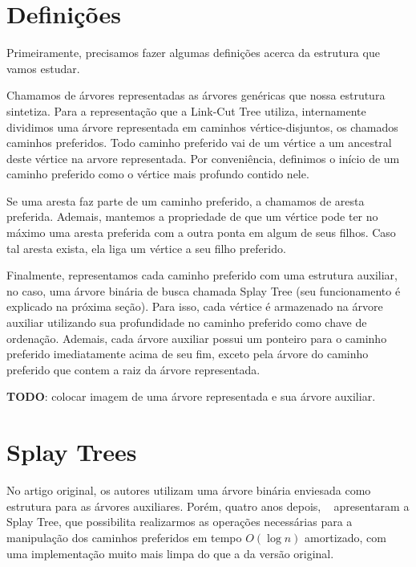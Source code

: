 \section{Definições}
\label{sec:lct-definicoes}

Primeiramente, precisamos fazer algumas definições acerca da estrutura que vamos estudar.

Chamamos de árvores representadas as árvores genéricas que nossa estrutura sintetiza. Para a representação que a Link-Cut Tree utiliza, internamente dividimos uma árvore representada em caminhos vértice-disjuntos, os chamados caminhos preferidos. Todo caminho preferido vai de um vértice a um ancestral deste vértice na arvore representada. Por conveniência, definimos o início de um caminho preferido como o vértice mais profundo contido nele.

Se uma aresta faz parte de um caminho preferido, a chamamos de aresta preferida. Ademais, mantemos a propriedade de que um vértice pode ter no máximo uma aresta preferida com a outra ponta em algum de seus filhos. Caso tal aresta exista, ela liga um vértice a seu filho preferido.

Finalmente, representamos cada caminho preferido com uma estrutura auxiliar, no caso, uma árvore binária de busca chamada Splay Tree (seu funcionamento é explicado na próxima seção). Para isso, cada vértice é armazenado na árvore auxiliar utilizando sua profundidade no caminho preferido como chave de ordenação. Ademais, cada árvore auxiliar possui um ponteiro para o caminho preferido imediatamente acima de seu fim, exceto pela árvore do caminho preferido que contem a raiz da árvore representada.

\begin{center}
    \textbf{TODO}: colocar imagem de uma árvore representada e sua árvore auxiliar.
\end{center}

\section{Splay Trees}
\label{sec:lct-splay-trees}

No artigo original, os autores utilizam uma árvore binária enviesada como estrutura para as árvores auxiliares. Porém, quatro anos depois, ~\citet{10.1145/3828.3835} apresentaram a Splay Tree, que possibilita realizarmos as operações necessárias para a manipulação dos caminhos preferidos em tempo $O(\log n)$ amortizado, com uma implementação muito mais limpa do que a da versão original.

